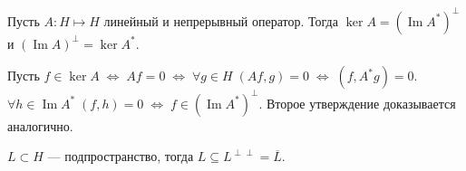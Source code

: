 \documentclass[12pt]{article}
\renewcommand{\Im}{\operatorname{Im}}
\begin{document}
\begin{Theor}[Фредгольма]
    Пусть $A : H \mapsto H$ линейный и непрерывный оператор. Тогда $\ker A = (\Im A^*)^\perp$ и $(\Im A)^\perp = \ker A^*$.
\end{Theor}
\begin{Proof}
Пусть $f \in \ker A\;\Leftrightarrow\;Af = 0\;\Leftrightarrow\;\forall g \in H\;(Af, g) = 0\;\Leftrightarrow\;(f, A^* g) = 0$.
$\forall h \in \Im A^*\;(f, h) = 0\;\Leftrightarrow\;f \in (\Im A^*)^\perp$. Второе утверждение доказывается аналогично.
\end{Proof}

\begin{Utv}
$L \subset H$ --- подпространство, тогда $L \subseteq L^{\perp\perp} = \overline{L}$.
\end{Utv}

\end{document}
